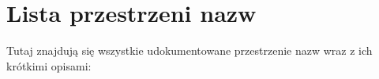 \section{Lista przestrzeni nazw}
Tutaj znajdują się wszystkie udokumentowane przestrzenie nazw wraz z ich krótkimi opisami\+:\begin{DoxyCompactList}
\item{}
\end{DoxyCompactList}
